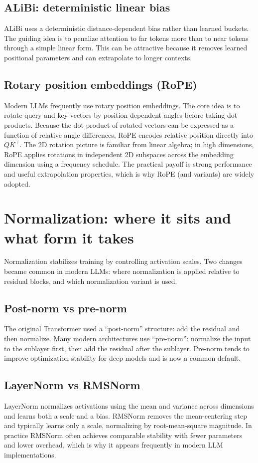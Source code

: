 \subsection{ALiBi: deterministic linear bias}
ALiBi uses a deterministic distance-dependent bias rather than learned buckets. The guiding idea is to penalize attention to far tokens more than to near tokens through a simple linear form. This can be attractive because it removes learned positional parameters and can extrapolate to longer contexts.

\subsection{Rotary position embeddings (RoPE)}
Modern LLMs frequently use rotary position embeddings. The core idea is to rotate query and key vectors by position-dependent angles before taking dot products. Because the dot product of rotated vectors can be expressed as a function of relative angle differences, RoPE encodes relative position directly into \(QK^\top\). The 2D rotation picture is familiar from linear algebra; in high dimensions, RoPE applies rotations in independent 2D subspaces across the embedding dimension using a frequency schedule. The practical payoff is strong performance and useful extrapolation properties, which is why RoPE (and variants) are widely adopted.

\section{Normalization: where it sits and what form it takes}
Normalization stabilizes training by controlling activation scales. Two changes became common in modern LLMs: where normalization is applied relative to residual blocks, and which normalization variant is used.

\subsection{Post-norm vs pre-norm}
The original Transformer used a “post-norm” structure: add the residual and then normalize. Many modern architectures use “pre-norm”: normalize the input to the sublayer first, then add the residual after the sublayer. Pre-norm tends to improve optimization stability for deep models and is now a common default.

\subsection{LayerNorm vs RMSNorm}
LayerNorm normalizes activations using the mean and variance across dimensions and learns both a scale and a bias. RMSNorm removes the mean-centering step and typically learns only a scale, normalizing by root-mean-square magnitude. In practice RMSNorm often achieves comparable stability with fewer parameters and lower overhead, which is why it appears frequently in modern LLM implementations.

